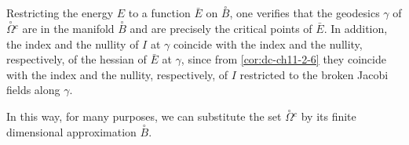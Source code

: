 \begin{remark}[Remark 2.12]
  Restricting the energy $E$ to a function $\bar E$ on $\overset{\circ}{B}$, one
  verifies that the geodesics $\gamma$ of $\overset{\circ}{\Omega}{}^c$ are in the
  manifold $\overset{\circ}{B}$ and are precisely the critical points of $\bar E$.
  In addition, the index and the nullity of $I$ at $\gamma$ coincide with the index
  and the nullity, respectively, of the hessian of $\bar E$ at $\gamma$, since from
  \cref{cor:dc-ch11-2-6} they coincide with the index and the nullity, respectively, of $I$
  restricted to the broken Jacobi fields along $\gamma$.
  
  In this way, for many purposes, we can substitute the set
  $\overset{\circ}{\Omega}{}^c$ by its finite dimensional approximation
  $\overset{\circ}{B}$.
\end{remark}
